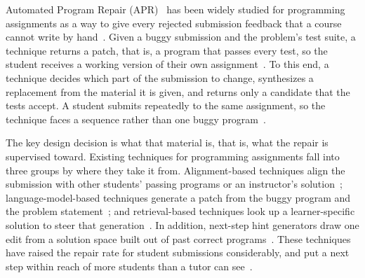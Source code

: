 \documentclass[10pt,conference]{IEEEtran}
\begin{document}
Automated Program Repair (APR)~\cite{gazzola2019automatic,monperrus2018automatic,weimer2009automatically,legoues2012genprog} has been widely studied for programming assignments as a way to give every rejected submission feedback that a course cannot write by hand~\cite{keuning2018systematic}. Given a buggy submission and the problem's test suite, a technique returns a patch, that is, a program that passes every test, so the student receives a working version of their own assignment~\cite{joshi2023repair,zhang2024pydex}. To this end, a technique decides which part of the submission to change, synthesizes a replacement from the material it is given, and returns only a candidate that the tests accept. A student submits repeatedly to the same assignment, so the technique faces a sequence rather than one buggy program~\cite{duan2024tiktoc}.

The key design decision is what that material is, that is, what the repair is supervised toward. Existing techniques for programming assignments fall into three groups by where they take it from. Alignment-based techniques align the submission with other students' passing programs or an instructor's solution~\cite{gulwani2018automated,wang2018search,hu2019re,heo2023referent,choi2021automated,choi2025automated}; language-model-based techniques generate a patch from the buggy program and the problem statement~\cite{joshi2023repair,zhang2024pydex,phung2023generating,liu2024fastfixer,yang2024cref,zhao2026peer,orvalho2025counterexample}; and retrieval-based techniques look up a learner-specific solution to steer that generation~\cite{dai2026learner}. In addition, next-step hint generators draw one edit from a solution space built out of past correct programs~\cite{piech2015embeddings,rivers2017data,price2017isnap,roest2024next}. These techniques have raised the repair rate for student submissions considerably, and put a next step within reach of more students than a tutor can see~\cite{keuning2018systematic,koutcheme2024benchmarking}.
\end{document}
